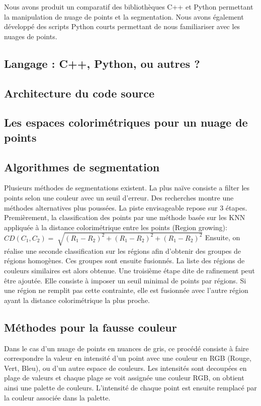 \documentclass[12pt,titlepage,french]{article}
\begin{document}
Nous avons produit un comparatif des bibliothèques C++ et Python permettant la manipulation de nuage de points et la segmentation.
Nous avons également développé des scripts Python courts permettant de nous familiariser avec les nuages de points.

\subsection{Langage : C++, Python, ou autres ?}


\subsection{Architecture du code source}


\subsection{Les espaces colorimétriques pour un nuage de points}


\subsection{Algorithmes de segmentation}
Plusieurs méthodes de segmentations existent. La plus naïve consiste a filter les points selon une couleur avec un seuil d'erreur.
Des recherches montre une méthodes alternatives plus poussées.
La piste envisageable repose sur 3 étapes.
Premièrement, la classification des points par une méthode basée sur les KNN appliquée à la distance colorimétrique entre les points (Region growing):
$
CD(C_1,C_2)=\sqrt[]{(R_1-R_2)^2 + (R_1-R_2)^2 + (R_1-R_2)^2}
$
Ensuite, on réalise une seconde classification sur les régions afin d'obtenir des groupes de régions homogènes.
Ces groupes sont ensuite fusionnés. La liste des régions de couleurs similaires est alors obtenue.
Une troisième étape dite de rafinement peut être ajoutée. Elle consiste à imposer un seuil minimal de points par régions.
Si une région ne remplit pas cette contrainte, elle est fusionnée avec l'autre région ayant la distance colorimétrique la plus proche.

\subsection{Méthodes pour la fausse couleur}
Dans le cas d'un nuage de points en nuances de gris, ce procédé consiste à faire correspondre la valeur en intensité d'un point avec une couleur en RGB (Rouge, Vert, Bleu), ou d'un autre espace de couleurs.
Les intensités sont decoupées en plage de valeurs et chaque plage se voit assignée une couleur RGB, on obtient ainsi une palette de couleurs. L'intensité de chaque point est ensuite remplacé par la couleur associée dans la palette.
\end{document}

